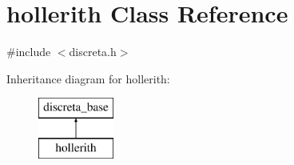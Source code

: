 \hypertarget{classhollerith}{}\section{hollerith Class Reference}
\label{classhollerith}


{\ttfamily \#include $<$discreta.\+h$>$}

Inheritance diagram for hollerith\+:\begin{figure}[H]
\begin{center}
\leavevmode
\includegraphics[height=2.000000cm]{classhollerith}
\end{center}
\end{figure}
